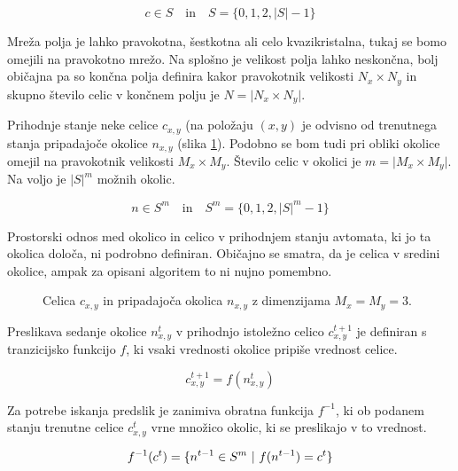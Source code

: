 \documentclass[12pt,a4paper,openany,twoside]{book}
\begin{document}
\begin{equation}
c \in S
\quad \textrm{in} \quad
S = \{ 0, 1, 2, {\lvert S \rvert} -1 \}
\end{equation}

Mreža polja je lahko pravokotna, šestkotna ali celo kvazikristalna, tukaj se
bomo omejili na pravokotno mrežo. Na splošno je velikost polja lahko neskončna,
bolj običajna pa so končna polja definira kakor pravokotnik velikosti \(N_x \times N_y\)
in skupno število celic v končnem polju je \(N=\lvert N_x \times N_y \rvert\).

Prihodnje stanje neke celice \(c_{x,y}\) (na položaju \((x,y)\)
je odvisno od trenutnega stanja pripadajoče okolice \(n_{x,y}\) (slika \ref{neighborhood}).
Podobno se bom tudi pri obliki okolice omejil na pravokotnik velikosti \(M_x \times M_y\).
Število celic v okolici je \(m=\lvert M_x \times M_y \rvert\).
Na voljo je \({\lvert S \rvert}^m\) možnih okolic.

\begin{equation}
n \in S^m
\quad \textrm{in} \quad
S^m = \{ 0, 1, 2, {\lvert S \rvert}^m -1 \}
\end{equation}

Prostorski odnos med okolico in celico v prihodnjem stanju avtomata, ki jo ta okolica določa,
ni podrobno definiran. Običajno se smatra, da je celica v sredini okolice, ampak za opisani algoritem to ni
nujno pomembno.

\begin{figure}[htb]
\centerline{}
\caption[Velikost okolice.]{Celica \(c_{x,y}\) in pripadajoča okolica \(n_{x,y}\) z dimenzijama \(M_x=M_y=3\).}
\label{neighborhood}
\end{figure}

Preslikava sedanje okolice \(n_{x,y}^{t}\) v prihodnjo istoležno celico \(c_{x,y}^{t+1}\) je definiran
s tranzicijsko funkcijo \(f\), ki vsaki vrednosti okolice pripiše vrednost celice.

\begin{equation}
c_{x,y}^{t+1} = f(n_{x,y}^{t})
\end{equation}

Za potrebe iskanja predslik je zanimiva obratna funkcija \(f^{-1}\), ki ob
podanem stanju trenutne celice \(c_{x,y}^{t}\) vrne množico okolic,
ki se preslikajo v to vrednost.

\begin{equation}
f^{-1}(c^{t}) = \{ n^{t-1} \in S^m \ \arrowvert \ f(n^{t-1}) = c^{t} \}
\end{equation}
\end{document}
